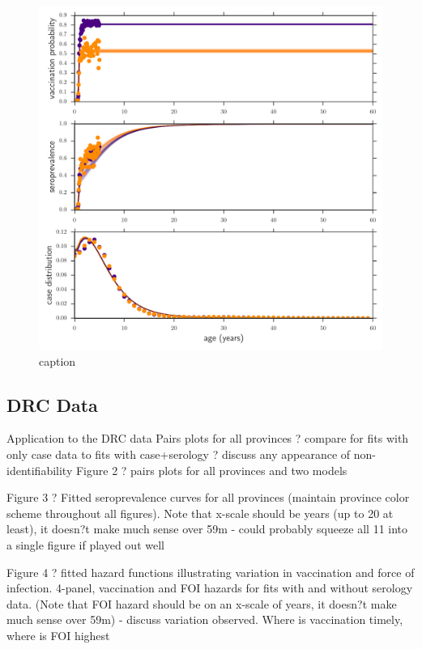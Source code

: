 \documentclass[nofootinbib,aps,pre,twocolumn,superscriptaddress,showkeys,showpacs]{revtex4-1}
\begin{document}
\begin{figure}
\includegraphics[width=\columnwidth,angle=0]{figures/vsc_simdata_vaxcase.pdf}
\caption{caption\label{fig:svcsimdata}}
\end{figure}

\subsection{DRC Data \label{subsec:DRC}}
Application to the DRC data
	Pairs plots for all provinces ? compare for fits with only case data to fits with case+serology ? discuss any appearance of non-identifiability 	
Figure 2 ? pairs plots for all provinces and two models
	

Figure 3 ? Fitted seroprevalence curves for all provinces (maintain province color scheme throughout all figures). Note that x-scale should be years (up to 20 at least), it doesn?t make much sense over 59m
	- could probably squeeze all 11 into a single figure if played out well

Figure 4 ? fitted hazard functions illustrating variation in vaccination and force of infection.  4-panel, vaccination and FOI hazards for fits with and without serology data. (Note that FOI hazard should be on an x-scale of years, it doesn?t make much sense over 59m)
	- discuss variation observed.  Where is vaccination timely, where is FOI highest
\end{document}
